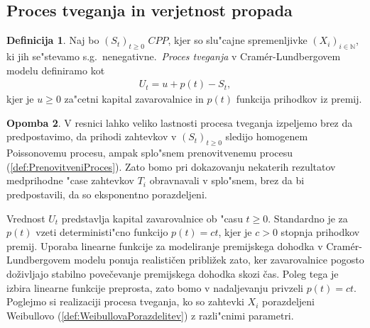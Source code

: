 \documentclass[12pt, a4paper, reqno]{amsart}
\theoremstyle{definition}
\newtheorem{definicija}{Definicija}[section]
\newtheorem{opomba}[definicija]{Opomba}
\theoremstyle{plain}
\newcommand{\N}{\mathbb{N}}
\newcommand{\1}{\mathds{1}}
\begin{document}
    \subsection{Proces tveganja in verjetnost propada}

        \begin{definicija}
            Naj bo $(S_t)_{t\geq0 }$ $CPP$, kjer so slu"cajne spremenljivke $(X_i)_{i\in\N}$, 
            ki jih se"stevamo s.g.\ nenegativne.\ \textit{Proces tveganja} v Cramér-Lundbergovem 
            modelu definiramo kot
            \begin{align*}
                U_t = u + p(t) - S_t,
            \end{align*}
            kjer je $u \geq 0$ za"cetni kapital zavarovalnice in $p(t)$ funkcija prihodkov iz premij. 
            \label{def:procesTveganja}
        \end{definicija}

        \begin{opomba}
            V resnici lahko veliko lastnosti procesa tveganja izpeljemo brez da predpostavimo, da prihodi 
            zahtevkov v $(S_t)_{t\geq0}$ sledijo homogenem Poissonovemu procesu,
            ampak splo"snem prenovitvenemu procesu (\ref{def:PrenovitveniProces}). 
            Zato bomo pri dokazovanju nekaterih rezultatov medprihodne "case zahtevkov $T_i$ obravnavali v 
            splo"snem, brez da bi predpostavili, da so eksponentno porazdeljeni.
            \label{op:procesTveganja}
        \end{opomba}

        Vrednost $U_t$ predstavlja kapital zavarovalnice ob "casu $t\geq0$. Standardno je za $p(t)$ 
        vzeti deterministi"cno funkcijo $p(t) = ct$, kjer je $c>0$ stopnja prihodkov premij.
        Uporaba linearne funkcije za modeliranje premijskega dohodka v Cramér-Lundbergovem 
        modelu ponuja realističen približek zato, ker zavarovalnice pogosto doživljajo 
        stabilno povečevanje premijskega dohodka skozi čas. Poleg tega je izbira linearne 
        funkcije preprosta, zato bomo v nadaljevanju privzeli $p(t) = ct$. Poglejmo si 
        realizaciji procesa tveganja, ko so zahtevki $X_i$ porazdeljeni Weibullovo 
        (\ref{def:WeibullovaPorazdelitev}) z razli"cnimi parametri. 
\end{document}
